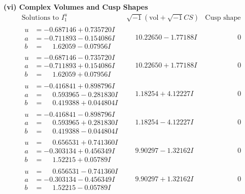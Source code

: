 \documentclass[1p]{elsarticle_modified}
\theoremstyle{definition}
\newcommand{\I}{\sqrt{-1}}
\begin{document}
\newpage\flushleft \textbf{(vi) Complex Volumes and Cusp Shapes}
$$\begin{array}{c|c|c}  
\text{Solutions to }I^u_{1}& \I (\text{vol} + \sqrt{-1}CS) & \text{Cusp shape}\\
 \hline 
\begin{aligned}
u &= -0.687146 + 0.735720 I \\
a &= -0.711893 - 0.154086 I \\
b &= \phantom{-}1.62059 - 0.07956 I\end{aligned}
 & \phantom{-}10.22650 - 1.77188 I & \phantom{-0.000000 } 0 \\ \hline\begin{aligned}
u &= -0.687146 - 0.735720 I \\
a &= -0.711893 + 0.154086 I \\
b &= \phantom{-}1.62059 + 0.07956 I\end{aligned}
 & \phantom{-}10.22650 + 1.77188 I & \phantom{-0.000000 } 0 \\ \hline\begin{aligned}
u &= -0.416841 + 0.898796 I \\
a &= \phantom{-}0.593965 - 0.281830 I \\
b &= \phantom{-}0.419388 + 0.044804 I\end{aligned}
 & \phantom{-}1.18254 + 4.12227 I & \phantom{-0.000000 } 0 \\ \hline\begin{aligned}
u &= -0.416841 - 0.898796 I \\
a &= \phantom{-}0.593965 + 0.281830 I \\
b &= \phantom{-}0.419388 - 0.044804 I\end{aligned}
 & \phantom{-}1.18254 - 4.12227 I & \phantom{-0.000000 } 0 \\ \hline\begin{aligned}
u &= \phantom{-}0.656531 + 0.741360 I \\
a &= -0.303134 + 0.456349 I \\
b &= \phantom{-}1.52215 + 0.05789 I\end{aligned}
 & \phantom{-}9.90297 - 1.32162 I & \phantom{-0.000000 } 0 \\ \hline\begin{aligned}
u &= \phantom{-}0.656531 - 0.741360 I \\
a &= -0.303134 - 0.456349 I \\
b &= \phantom{-}1.52215 - 0.05789 I\end{aligned}
 & \phantom{-}9.90297 + 1.32162 I & \phantom{-0.000000 } 0 \\ \hline\begin{aligned}

\end{aligned}
\end{array}$$
\end{document}
